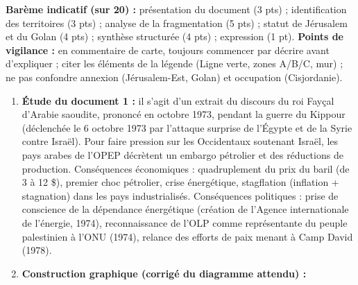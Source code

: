 \documentclass[11pt]{article}
\begin{document}
\begin{corrige}
\begin{enumerate}
\end{enumerate}
\textbf{Barème indicatif (sur 20) :} présentation du document (3 pts) ; identification des territoires (3 pts) ; analyse de la fragmentation (5 pts) ; statut de Jérusalem et du Golan (4 pts) ; synthèse structurée (4 pts) ; expression (1 pt).
\textbf{Points de vigilance :} en commentaire de carte, toujours commencer par décrire avant d'expliquer ; citer les éléments de la légende (Ligne verte, zones A/B/C, mur) ; ne pas confondre annexion (Jérusalem-Est, Golan) et occupation (Cisjordanie).
\end{corrige}

\begin{corrige}
\begin{enumerate}
    \item \textbf{Étude du document 1 :} il s'agit d'un extrait du discours du roi Fayçal d'Arabie saoudite, prononcé en octobre 1973, pendant la guerre du Kippour (déclenchée le 6 octobre 1973 par l'attaque surprise de l'Égypte et de la Syrie contre Israël). Pour faire pression sur les Occidentaux soutenant Israël, les pays arabes de l'OPEP décrètent un embargo pétrolier et des réductions de production. Conséquences économiques : quadruplement du prix du baril (de 3 à 12 \$), premier choc pétrolier, crise énergétique, stagflation (inflation + stagnation) dans les pays industrialisés. Conséquences politiques : prise de conscience de la dépendance énergétique (création de l'Agence internationale de l'énergie, 1974), reconnaissance de l'OLP comme représentante du peuple palestinien à l'ONU (1974), relance des efforts de paix menant à Camp David (1978).
    \item \textbf{Construction graphique (corrigé du diagramme attendu) :}
\begin{popfigure}
\end{popfigure}
\end{enumerate}
\end{corrige}
\end{document}

